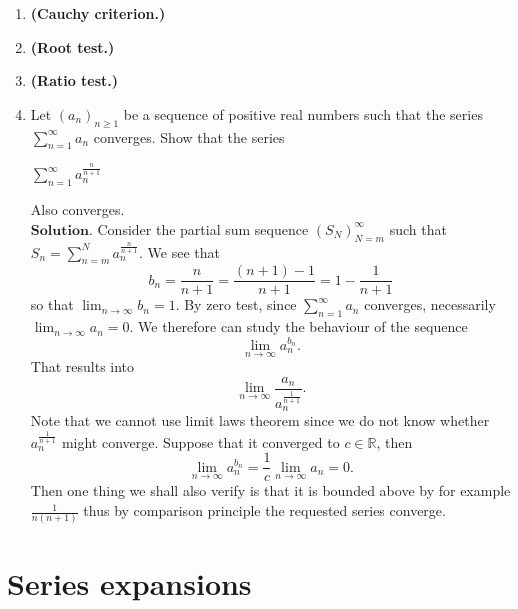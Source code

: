 \documentclass{article}
\theoremstyle{remark}
\begin{document}
\begin{enumerate}
    
    \item \textbf{(Cauchy criterion.)}

    \item \textbf{(Root test.)}
    
    
    \item \textbf{(Ratio test.)}

    \item Let $(a_n)_{n\geq 1}$ be a sequence of positive real numbers such that
    the series $\sum_{n=1}^{\infty}a_n$ converges. Show that the series
    \begin{center}
        $\displaystyle \sum_{n=1}^{\infty}a_n^{\frac{n}{n+1}}$
    \end{center}
    Also converges.\\
    $\textbf{Solution.}$
    Consider the partial sum sequence $(S_N)_{N=m}^{\infty}$ such that $S_n = \sum_{n=m}^{N}a_n^{\frac{n}{n+1}}$.
    We see that 
    \[
    b_n = \frac{n}{n+1} = \frac{(n+1)-1}{n+1} = 1 - \frac{1}{n+1}
    \]
    so that $\lim_{n\to\infty}b_n = 1$.
    By zero test, since $\sum_{n=1}^{\infty}a_n$ converges, necessarily $\lim_{n\to\infty}a_n = 0$.
    We therefore can study the behaviour of the sequence
    \[
    \lim_{n\to\infty} a_n^{b_n}.
    \]
    That results into 
    \[
    \lim_{n\to\infty} \frac{a_n}{a_n^{\frac{1}{n+1}}}.
    \]
    Note that we cannot use limit laws theorem since we do not know whether $a_n^{\frac{1}{n+1}}$ might converge.
    Suppose that it converged to $c \in \mathbb{R}$, then
    \[
    \lim_{n\to\infty}a_n^{b_n} = \frac{1}{c}\lim_{n\to\infty}a_n = 0.
    \]
    Then one thing we shall also verify is that it is bounded above by for example $\frac{1}{n(n+1)}$ thus 
    by comparison principle the requested series converge.



\end{enumerate}
\section*{Series expansions}
\end{document}
